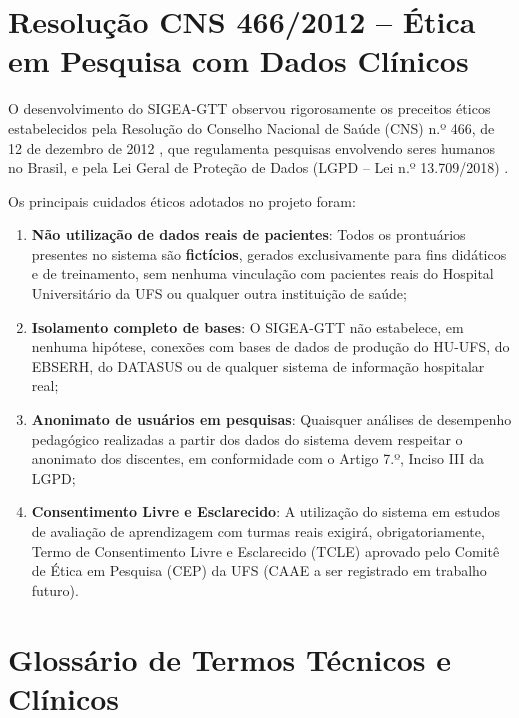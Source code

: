 \begin{anexosenv}
\chapter{Resolução CNS 466/2012 -- Ética em Pesquisa com Dados Clínicos}
\label{anex_cns_466}

O desenvolvimento do SIGEA-GTT observou rigorosamente os preceitos éticos
estabelecidos pela Resolução do Conselho Nacional de Saúde (CNS)
n.º 466, de 12 de dezembro de 2012 \cite{cns466_2012}, que regulamenta
pesquisas envolvendo seres humanos no Brasil, e pela Lei Geral de Proteção
de Dados (LGPD -- Lei n.º 13.709/2018) \cite{lgpd2018}.

Os principais cuidados éticos adotados no projeto foram:

\begin{enumerate}
    \item \textbf{Não utilização de dados reais de pacientes}: Todos os
    prontuários presentes no sistema são \textbf{fictícios}, gerados
    exclusivamente para fins didáticos e de treinamento, sem nenhuma
    vinculação com pacientes reais do Hospital Universitário da UFS ou
    qualquer outra instituição de saúde;

    \item \textbf{Isolamento completo de bases}: O SIGEA-GTT não estabelece,
    em nenhuma hipótese, conexões com bases de dados de produção do HU-UFS,
    do EBSERH, do DATASUS ou de qualquer sistema de informação hospitalar real;

    \item \textbf{Anonimato de usuários em pesquisas}: Quaisquer análises
    de desempenho pedagógico realizadas a partir dos dados do sistema
    devem respeitar o anonimato dos discentes, em conformidade com o
    Artigo 7.º, Inciso III da LGPD;

    \item \textbf{Consentimento Livre e Esclarecido}: A utilização do
    sistema em estudos de avaliação de aprendizagem com turmas reais
    exigirá, obrigatoriamente, Termo de Consentimento Livre e Esclarecido
    (TCLE) aprovado pelo Comitê de Ética em Pesquisa (CEP) da UFS
    (CAAE a ser registrado em trabalho futuro).
\end{enumerate}

\chapter{Glossário de Termos Técnicos e Clínicos}
\label{anex_glossario}


\end{anexosenv}
